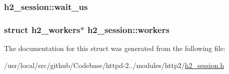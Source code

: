 \subsubsection[{\texorpdfstring{wait\+\_\+us}{wait_us}}]{ h2\+\_\+session\+::wait\+\_\+us}\hypertarget{structh2__session_a34ee9d398f9b88dbf2c3ee53ee97875a}{}\label{structh2__session_a34ee9d398f9b88dbf2c3ee53ee97875a}
\subsubsection[{\texorpdfstring{workers}{workers}}]{\setlength{\rightskip}{0pt plus 5cm}struct {\bf h2\+\_\+workers}$\ast$ h2\+\_\+session\+::workers}\hypertarget{structh2__session_a24c052e0673df7f54f52f66dc3418057}{}\label{structh2__session_a24c052e0673df7f54f52f66dc3418057}


The documentation for this struct was generated from the following file\+:\begin{DoxyCompactItemize}
\item 
/usr/local/src/github/\+Codebase/httpd-\/2../modules/http2/\hyperlink{h2__session_8h}{h2\+\_\+session.\+h}\end{DoxyCompactItemize}
